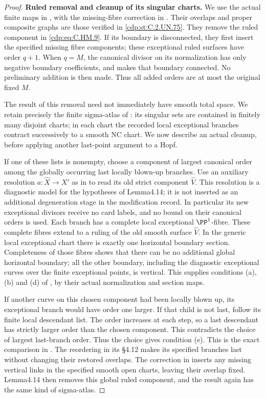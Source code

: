 \begin{proof}
\par\medskip\noindent\textbf{Ruled removal and cleanup of its singular charts.}
We use the actual finite maps in
\cite[\S\S4.10.7--4.10.9,4.14]{Kulikov1977}, with
the missing-fibre correction in
\cite[\S8]{Kulikov1981}.  Their overlaps and proper
composite graphs are those verified in \ref{cdp:st:C.2.UN.75}.
They remove the ruled component in \eqref{cdp:eq:C.HM.9}.
If its boundary is disconnected, they first insert
the specified missing fibre components; these
exceptional ruled surfaces have order \(q+1\).
When \(q=M\), the canonical divisor on its
normalization has only negative boundary
coefficients, and \cite[Lemma2.19]{Kulikov1977}
makes that boundary connected.  No preliminary
addition is then made.  Thus all added orders are
at most the original fixed \(M\).

The result of this removal need not immediately
have smooth total space.  We retain precisely the
finite sigma-atlas of
\cite[\S4.11.2]{Kulikov1977}: its singular sets are
contained in finitely many disjoint charts; in each
chart the recorded local exceptional branches
contract successively to a smooth NC chart.  We
now describe an actual cleanup, before applying
another last-point argument to a Hopf.

If one of these lists is nonempty, choose a
component of largest canonical order among the
globally occurring last locally blown-up branches.
Use an auxiliary resolution \(a:\widehat X\to X'\)
as in \cite[\S4.13]{Kulikov1977} to read its
old strict component \(\widehat V\).  This
resolution is a diagnostic model for the
hypotheses of Lemma4.14; it is not inserted
as an additional degeneration stage in the
modification record.  In particular its new
exceptional divisors receive no card labels,
and no bound on their canonical orders is used.
Each branch has a complete local exceptional
\(\PP^1\)-fibre.  These complete fibres extend to
a ruling of the old smooth surface
\(\widehat V\).  In the
generic local exceptional chart there is exactly
one horizontal boundary section.  Completeness
of those fibres shows that there can be no
additional global horizontal boundary; all the
other boundary, including the diagnostic
exceptional curves over the finite exceptional
points, is vertical.  This supplies
conditions (a), (b) and (d) of
\cite[Lemma4.14]{Kulikov1977}, by their actual
normalization and section maps.

If another curve on this chosen component had
been locally blown up, its exceptional branch
would have order one larger.  If that child
is not last, follow its finite local descendant
list.  The order increases at each step, so
a last descendant has strictly larger order
than the chosen component.  This contradicts
the choice of largest last-branch order.
Thus the choice gives condition
(e).  This is the exact comparison in
\cite[\S4.16.2]{Kulikov1977}.  The reordering in
its \S4.12 makes its specified branches last
without changing their restored overlaps.
The correction in \cite[\S8]{Kulikov1981}
inserts any missing vertical links in the
specified smooth open charts, leaving their
overlap fixed.  Lemma4.14 then removes this
global ruled component, and the result again
has the same kind of sigma-atlas.


\end{proof}
